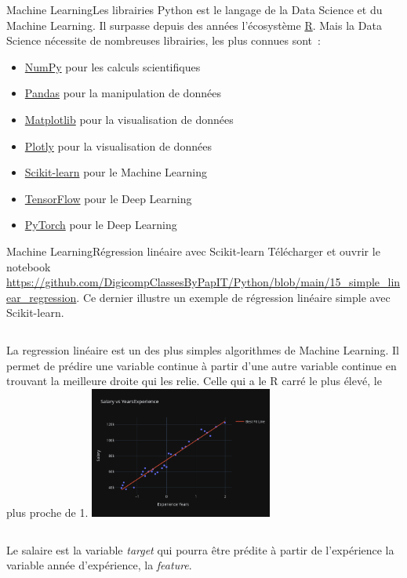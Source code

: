 \documentclass{beamer}
\begin{document}
    \begin{frame}{Machine Learning}{Les librairies}
        Python est le langage de la Data Science et du Machine Learning.
        Il surpasse depuis des années l'écosystème \href{https://posit.co/download/rstudio-desktop/}{R}.
        \bigbreak
        Mais la Data Science nécessite de nombreuses librairies, les plus connues sont~:
        \begin{itemize}
            \item \href{https://numpy.org/}{NumPy} pour les calculs scientifiques
            \item \href{https://pandas.pydata.org/}{Pandas} pour la manipulation de données
            \item \href{https://matplotlib.org/}{Matplotlib} pour la visualisation de données
            \item \href{https://plotly.com/}{Plotly} pour la visualisation de données
            \item \href{https://scikit-learn.org/stable/}{Scikit-learn} pour le Machine Learning
            \item \href{https://www.tensorflow.org/}{TensorFlow} pour le Deep Learning
            \item \href{https://pytorch.org/}{PyTorch} pour le Deep Learning
        \end{itemize}
    \end{frame}

    \begin{frame}{Machine Learning}{Régression linéaire avec Scikit-learn}
        Télécharger et ouvrir le notebook \url{https://github.com/DigicompClassesByPapIT/Python/blob/main/15_simple_linear_regression}.
        Ce dernier illustre un exemple de régression linéaire simple avec Scikit-learn.
        \bigbreak
        \begin{columns}
            La regression linéaire est un des plus simples algorithmes de Machine Learning.
            Il permet de prédire une variable continue à partir d'une autre variable continue en trouvant la meilleure droite qui les relie.
            Celle qui a le R carré le plus élevé, le plus proche de 1.
            \centering
            \includegraphics[width=6cm]{image/linear-regression}
        \end{columns}
        \bigbreak
        Le salaire est la variable \textit{target} qui pourra être prédite à partir de l'expérience la variable année d'expérience, la \textit{feature}.
    \end{frame}
\end{document}
